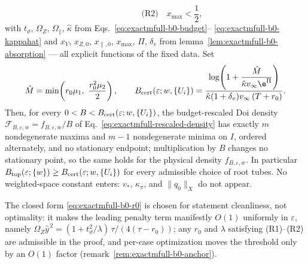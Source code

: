 \begin{proposition}
\begin{equation}
 \qquad\qquad
 \text{(R2)}\quad x_{\max}<\frac12,
 \label{eq:exactmfull-b0-radius}
\end{equation}
with \(t_\vartheta\), \(\Omega_Z\), \(\Omega_\parallel\), \(\hat\kappa\)
from Eqs.~\eqref{eq:exactmfull-b0-budget}--%
\eqref{eq:exactmfull-b0-kappahat} and \(x_V\), \(x_{Z,0}\),
\(x_{\parallel,0}\), \(x_{\max}\), \(\Pi\), \(\delta_v\) from
lemma~\ref{lem:exactmfull-b0-absorption} --- all explicit functions of the
fixed data.  Set
\begin{equation}
 \hat M=\min\!\left(r_0\mu_1,\ \frac{r_0^2\mu_2}{2}\right),
 \qquad
 B_{\rm cert}(\varepsilon;w,\{U_i\})
 =\frac{\log\!\left(1+\dfrac{\hat M}{\hat\kappa v_\infty\e^{\Pi}}\right)}
 {\hat\kappa(1+\delta_v)v_\infty\,(T+r_0)}.
 \label{eq:exactmfull-b0-threshold}
\end{equation}
Then, for every
\(0<B<B_{\rm cert}(\varepsilon;w,\{U_i\})\), the budget-rescaled
Doi density \(\mathcal F_{B,\varepsilon,w}=f_{B,\varepsilon,w}/B\) of
Eq.~\eqref{eq:exactmfull-rescaled-density} has exactly \(m\) nondegenerate
maxima and \(m-1\) nondegenerate minima on \(I\), ordered alternately, and
no stationary endpoint; multiplication by \(B\) changes no stationary
point, so the same holds for the physical density
\(f_{B,\varepsilon,w}\).  In particular
\(B_{\rm top}(\varepsilon;\{w\})
\ge B_{\rm cert}(\varepsilon;w,\{U_i\})\) for every admissible choice of
root tubes.  No weighted-space constant enters: \(v_*\),
\(\kappa_\pi\), and \(\|q_0\|_X\) do not appear.
\end{proposition}

The closed form \eqref{eq:exactmfull-b0-r0} is chosen for statement
cleanliness, not optimality: it makes the leading penalty term manifestly
\(O(1)\) uniformly in \(\varepsilon\), namely
\(\Omega_Z\hat y^{\,2}=(1+t_\vartheta^2/\lambda)\,\tau/(4(\tau-r_0))\); any
\(r_0\) and \(\lambda\) satisfying (R1)--(R2) are admissible in the proof,
and per-case optimization moves the threshold only by an \(O(1)\) factor
(remark~\ref{rem:exactmfull-b0-anchor}).


